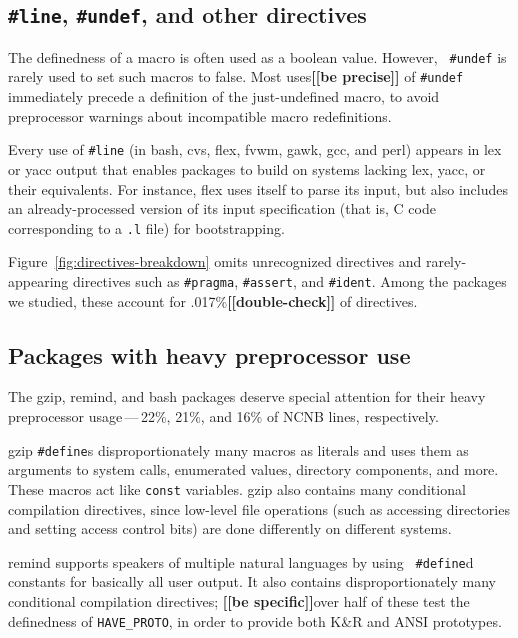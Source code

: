 \documentclass[10pt]{article}
\newcommand{\comment}[1]{\textbf{[[#1]]}}
\newcommand{\pkg}[1]{\textsf{#1}}
\begin{document}
\subsection{{\tt \#line}, {\tt \#undef}, and other directives}

The definedness of a macro is often used as a boolean value.  However, {\tt
\#undef} is rarely used to set such macros to false.  Most
uses\comment{be precise} of {\tt \#undef} immediately precede a definition
of the just-undefined macro, to avoid preprocessor warnings about
incompatible macro redefinitions.

Every use of {\tt \#line} (in \pkg{bash}, \pkg{cvs}, \pkg{flex}, \pkg{fvwm},
\pkg{gawk}, \pkg{gcc}, and \pkg{perl}) appears in lex or yacc
output that enables packages to build on systems lacking lex, yacc, or
their equivalents.  For instance, \pkg{flex} uses itself to parse its
input, but also includes an already-processed version of its input
specification (that is, C code corresponding to a {\tt .l} file) for
bootstrapping.


Figure~\ref{fig:directives-breakdown} omits unrecognized directives and
rarely-appearing directives such as {\tt \#pragma}, {\tt \#assert}, and
{\tt \#ident}.  Among the packages we studied, these account for
.017\%\comment{double-check} of directives.


\subsection{Packages with heavy preprocessor use}

The \pkg{gzip}, \pkg{remind}, and \pkg{bash} packages deserve
special attention for their heavy preprocessor usage\,---\,22\%, 21\%, and
16\% of NCNB lines, respectively.

\pkg{gzip} {\tt \#define}s disproportionately many macros as literals and
uses them as arguments to system calls, enumerated values, directory
components, and more.  These macros act like {\tt const} variables.
\pkg{gzip} also contains many conditional compilation directives, since
low-level file operations (such as accessing directories and setting access
control bits) are done differently on different systems.

\pkg{remind} supports speakers of multiple natural languages by using {\tt
\#define}d constants for basically all user output.  It also contains
disproportionately many conditional compilation directives; \comment{be specific}over half of
these test the definedness of \verb|HAVE_PROTO|, in order to provide both
K\&R and ANSI prototypes.
\end{document}
